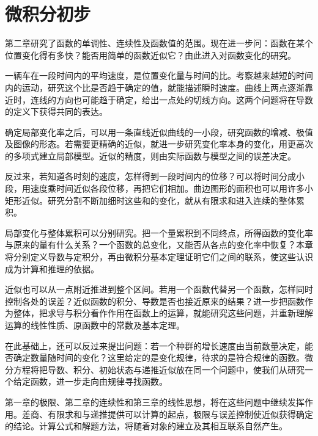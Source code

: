 \chapter{微积分初步}
\label{chap:calculus}

第二章研究了函数的单调性、连续性及函数值的范围。现在进一步问：函数在某个位置变化得有多快？能否用简单的函数近似它？由此进入对函数变化的研究。

一辆车在一段时间内的平均速度，是位置变化量与时间的比。考察越来越短的时间内的运动，研究这个比是否趋于确定的值，就能描述瞬时速度。曲线上两点逐渐靠近时，连线的方向也可能趋于确定，给出一点处的切线方向。这两个问题将在导数的定义下获得共同的表达。

确定局部变化率之后，可以用一条直线近似曲线的一小段，研究函数的增减、极值及图像的形态。若需要更精确的近似，就进一步研究变化率本身的变化，用更高次的多项式建立局部模型。近似的精度，则由实际函数与模型之间的误差决定。

反过来，若知道各时刻的速度，怎样得到一段时间内的位移？可以将时间分成小段，用速度乘时间近似各段位移，再把它们相加。曲边图形的面积也可以用许多小矩形近似。研究分割不断加细时这些和的变化，就从有限求和进入连续的整体累积。

局部变化与整体累积可以分别研究。把一个量累积到不同终点，所得函数的变化率与原来的量有什么关系？一个函数的总变化，又能否从各点的变化率中恢复？本章将分别定义导数与定积分，再由微积分基本定理证明它们之间的联系，使这些认识成为计算和推理的依据。

近似也可以从一点附近推进到整个区间。若用一个函数代替另一个函数，怎样同时控制各处的误差？近似函数的积分、导数是否也接近原来的结果？进一步把函数作为整体，把求导与积分看作作用在函数上的运算，就能研究这些问题，并重新理解运算的线性性质、原函数中的常数及基本定理。

在此基础上，还可以反过来提出问题：若一个种群的增长速度由当前数量决定，能否确定数量随时间的变化？这里给定的是变化规律，待求的是符合规律的函数。微分方程将把导数、积分、初始状态与递推近似放在同一个问题中，使我们从研究一个给定函数，进一步走向由规律寻找函数。

第一章的极限、第二章的连续性和第三章的线性思想，将在这些问题中继续发挥作用。差商、有限求和与递推提供可以计算的起点，极限与误差控制使近似获得确定的结论。计算公式和解题方法，将随着对象的建立及其相互联系自然产生。
















